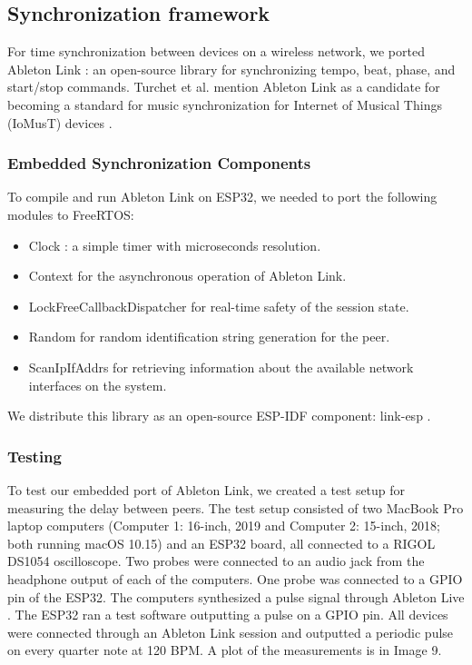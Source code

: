 \documentclass[sigconf]{nimeart}
\begin{document}
\subsection{Synchronization framework}\label{synchronization-framework}

For time synchronization between devices on a wireless network, we ported Ableton Link \cite{c28}: an open-source library for synchronizing tempo, beat, phase, and start/stop commands. Turchet et al. mention Ableton Link as a candidate for becoming a standard for music synchronization for Internet of Musical Things (IoMusT) devices \cite{c29}.

\subsubsection{Embedded Synchronization Components}\label{embedded-synchronization-components}

To compile and run Ableton Link on ESP32, we needed to port the following modules to FreeRTOS:

\begin{itemize}
\item
  Clock : a simple timer with microseconds resolution.
\item
  Context for the asynchronous operation of Ableton Link.
\item
  LockFreeCallbackDispatcher for real-time safety of the session state.
\item
  Random for random identification string generation for the peer.
\item
  ScanIpIfAddrs for retrieving information about the available network interfaces on the system.
\end{itemize}

We distribute this library as an open-source ESP-IDF component: link-esp \cite{c30}.

\subsubsection{Testing}\label{testing-1}

To test our embedded port of Ableton Link, we created a test setup for measuring the delay between peers. The test setup consisted of two MacBook Pro laptop computers (Computer 1: 16-inch, 2019 and Computer 2: 15-inch, 2018; both running macOS 10.15) and an ESP32 board, all connected to a RIGOL DS1054 oscilloscope. Two probes were connected to an audio jack from the headphone output of each of the computers. One probe was connected to a GPIO pin of the ESP32. The computers synthesized a pulse signal through Ableton Live \cite{c31}. The ESP32 ran a test software outputting a pulse on a GPIO pin. All devices were connected through an Ableton Link session and outputted a periodic pulse on every quarter note at 120 BPM. A plot of the measurements is in Image 9.
\end{document}
